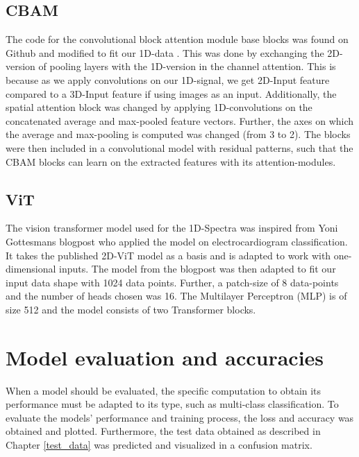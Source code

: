 \subsection{CBAM}
The code for the convolutional block attention module base blocks was found on Github and modified to fit our 1D-data \cite{mazzia__2023}. This was done by exchanging the 2D-version of pooling layers with the 1D-version in the channel attention. This is because as we apply convolutions on our 1D-signal, we get 2D-Input feature compared to a 3D-Input feature if using images as an input. Additionally, the spatial attention block was changed by applying 1D-convolutions on the concatenated average and max-pooled feature vectors. Further, the axes on which the average and max-pooling is computed was changed (from 3 to 2).
The blocks were then included in a convolutional model with residual patterns, such that the CBAM blocks can learn on the extracted features with its attention-modules.



\subsection{ViT}
The vision transformer model used for the 1D-Spectra was inspired from Yoni Gottesmans blogpost \cite{noauthor_interpretable_2023} who applied the model on electrocardiogram classification. It takes the published 2D-ViT model \cite{dosovitskiy_image_2021}as a basis and is adapted to work with one-dimensional inputs.
The model from the blogpost was then adapted to fit our input data shape with 1024 data points. Further, a patch-size of 8 data-points and the number of heads chosen was 16.
The Multilayer Perceptron (MLP) is of size 512 and the model consists of two Transformer blocks.



\section{Model evaluation and accuracies}

When a model should be evaluated, the specific computation to obtain its performance must be adapted to its type, such as multi-class classification. 
To evaluate the models' performance and training process, the loss and accuracy was obtained and plotted. Furthermore, the test data obtained as described in Chapter \ref{test_data} was predicted and visualized in a confusion matrix.

